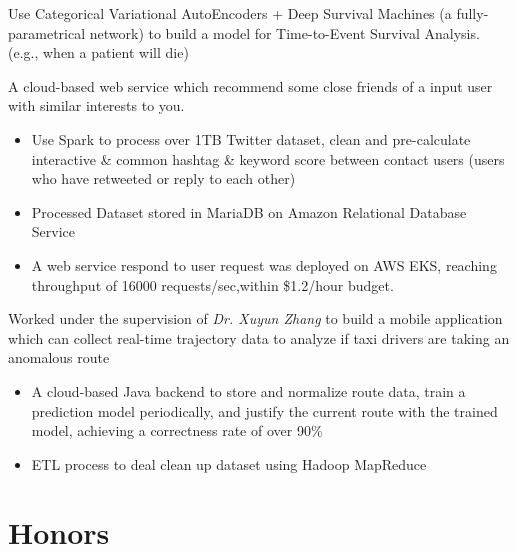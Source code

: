 \documentclass{resume}
\begin{document}
\begin{flushleft}
Use Categorical Variational AutoEncoders + Deep Survival Machines (a fully-parametrical network) to build a model for Time-to-Event Survival Analysis. (e.g., when a patient will die)

A cloud-based web service which recommend some close friends of a input user with similar interests to you.
\begin{itemize}
    \item Use Spark to process over 1TB Twitter dataset, clean and pre-calculate interactive \& common hashtag \linebreak \& keyword score between contact users (users who have retweeted or reply to each other)
    \item Processed Dataset stored in MariaDB on Amazon Relational Database Service
    \item A web service respond to user request was deployed on AWS EKS, reaching throughput of 16000 requests/sec,\linebreak within \$1.2/hour budget.
\end{itemize}


Worked under the supervision of \textit{Dr. Xuyun Zhang} to build a mobile application which can collect real-time trajectory data to analyze if taxi drivers are taking an anomalous route
\begin{itemize}
    \item A cloud-based Java backend to store and normalize route data, train a prediction model periodically, \linebreak and justify the current route with the trained model, achieving a correctness rate of over 90\%
    \item ETL process to deal clean up dataset using Hadoop MapReduce
\end{itemize}
\end{flushleft}

\section{Honors}
\end{document}
